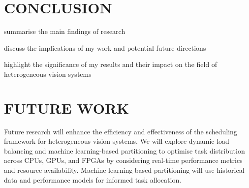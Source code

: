 \documentclass[]{spie}  %
\begin{document}



















\section{CONCLUSION}
\label{sec:conclusion}

summarise the main findings of research

discuss the implications of my work and potential future directions

highlight the significance of my results and their impact on the field of heterogeneous vision systems


\section{FUTURE WORK}
\label{sec:future work}

Future research will enhance the efficiency and effectiveness of the scheduling framework for heterogeneous vision systems. We will explore dynamic load balancing and machine learning-based partitioning to optimise task distribution across CPUs, GPUs, and FPGAs by considering real-time performance metrics and resource availability. Machine learning-based partitioning will use historical data and performance models for informed task allocation.
\end{document}
